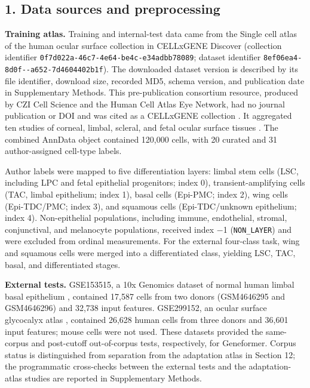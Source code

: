 \documentclass[12pt,letterpaper]{article}
\begin{document}
\subsection*{1. Data sources and preprocessing}

\textbf{Training atlas.} Training and internal-test data came from the Single cell atlas of the human ocular surface collection in CELLxGENE Discover (collection identifier \texttt{0f7d022a-\allowbreak 46c7-\allowbreak 4e64-\allowbreak be4c-\allowbreak e34adbb78089}; dataset identifier \texttt{8ef06ea4-\allowbreak 8d0f--\allowbreak a652-\allowbreak 7d4604402b1f}). The downloaded dataset version is described by its file identifier, download size, recorded MD5, schema version, and publication date in Supplementary Methods. This pre-publication consortium resource, produced by CZI Cell Science and the Human Cell Atlas Eye Network, had no journal publication or DOI and was cited as a CELLxGENE collection \cite{chen2026cellxgene}. It aggregated ten studies of corneal, limbal, scleral, and fetal ocular surface tissues \cite{li2021oculsurf,li2021iovs,maiti2022,collin2021,dou2021,catala2021,gautam2021}. The combined AnnData object contained 120,000 cells, with 20 curated and 31 author-assigned cell-type labels.

Author labels were mapped to five differentiation layers: limbal stem cells (LSC, including LPC and fetal epithelial progenitors; index 0), transient-amplifying cells (TAC, limbal epithelium; index 1), basal cells (Epi-PMC; index 2), wing cells (Epi-TDC/PMC; index 3), and squamous cells (Epi-TDC/unknown epithelium; index 4). Non-epithelial populations, including immune, endothelial, stromal, conjunctival, and melanocyte populations, received index $-$1 (\texttt{NON\_\allowbreak LAYER}) and were excluded from ordinal measurements. For the external four-class task, wing and squamous cells were merged into a differentiated class, yielding LSC, TAC, basal, and differentiated stages.

\textbf{External tests.} GSE153515, a 10x Genomics dataset of normal human limbal basal epithelium \cite{li2021oculsurf,li2021iovs}, contained 17,587 cells from two donors (GSM4646295 and GSM4646296) and 32,738 input features. GSE299152, an ocular surface glycocalyx atlas \cite{gse299152}, contained 26,628 human cells from three donors and 36,601 input features; mouse cells were not used. These datasets provided the same-corpus and post-cutoff out-of-corpus tests, respectively, for Geneformer. Corpus status is distinguished from separation from the adaptation atlas in Section 12; the programmatic cross-checks between the external tests and the adaptation-atlas studies are reported in Supplementary Methods.
\end{document}
